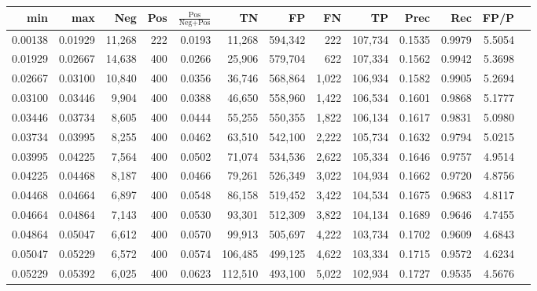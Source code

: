 \begin{tabular}{rrrrrrrrrrrrr}
\toprule
    min &     max &    Neg & Pos & $\frac{\text{Pos}}{\text{Neg}+\text{Pos}}$ &      TN &      FP &      FN &      TP &   Prec &    Rec &   FP/P \\
\midrule
0.00138 & 0.01929 & 11,268 & 222 &                                     0.0193 &  11,268 & 594,342 &     222 & 107,734 & 0.1535 & 0.9979 & 5.5054 \\
0.01929 & 0.02667 & 14,638 & 400 &                                     0.0266 &  25,906 & 579,704 &     622 & 107,334 & 0.1562 & 0.9942 & 5.3698 \\
0.02667 & 0.03100 & 10,840 & 400 &                                     0.0356 &  36,746 & 568,864 &   1,022 & 106,934 & 0.1582 & 0.9905 & 5.2694 \\
0.03100 & 0.03446 &  9,904 & 400 &                                     0.0388 &  46,650 & 558,960 &   1,422 & 106,534 & 0.1601 & 0.9868 & 5.1777 \\
0.03446 & 0.03734 &  8,605 & 400 &                                     0.0444 &  55,255 & 550,355 &   1,822 & 106,134 & 0.1617 & 0.9831 & 5.0980 \\
0.03734 & 0.03995 &  8,255 & 400 &                                     0.0462 &  63,510 & 542,100 &   2,222 & 105,734 & 0.1632 & 0.9794 & 5.0215 \\
0.03995 & 0.04225 &  7,564 & 400 &                                     0.0502 &  71,074 & 534,536 &   2,622 & 105,334 & 0.1646 & 0.9757 & 4.9514 \\
0.04225 & 0.04468 &  8,187 & 400 &                                     0.0466 &  79,261 & 526,349 &   3,022 & 104,934 & 0.1662 & 0.9720 & 4.8756 \\
0.04468 & 0.04664 &  6,897 & 400 &                                     0.0548 &  86,158 & 519,452 &   3,422 & 104,534 & 0.1675 & 0.9683 & 4.8117 \\
0.04664 & 0.04864 &  7,143 & 400 &                                     0.0530 &  93,301 & 512,309 &   3,822 & 104,134 & 0.1689 & 0.9646 & 4.7455 \\
0.04864 & 0.05047 &  6,612 & 400 &                                     0.0570 &  99,913 & 505,697 &   4,222 & 103,734 & 0.1702 & 0.9609 & 4.6843 \\
0.05047 & 0.05229 &  6,572 & 400 &                                     0.0574 & 106,485 & 499,125 &   4,622 & 103,334 & 0.1715 & 0.9572 & 4.6234 \\
0.05229 & 0.05392 &  6,025 & 400 &                                     0.0623 & 112,510 & 493,100 &   5,022 & 102,934 & 0.1727 & 0.9535 & 4.5676 \\

\end{tabular}
